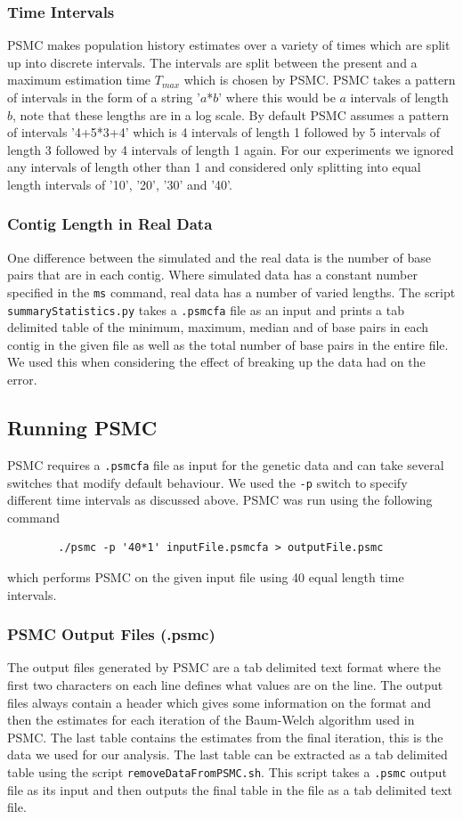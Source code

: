 \documentclass[11pt,a4paper]{article}
\begin{document}
\subsubsection{Time Intervals}
PSMC makes population history estimates over a variety of times which are split up into discrete intervals. The intervals are split between the present and a maximum estimation time $T_{max}$ which is chosen by PSMC. PSMC takes a pattern of intervals in the form of a string '$a$*$b$' where this would be $a$ intervals of length $b$, note that these lengths are in a log scale. By default PSMC assumes a pattern of intervals '4+5*3+4' which is 4 intervals of length 1 followed by 5 intervals of length 3 followed by 4 intervals of length 1 again. For our experiments we ignored any intervals of length other than 1 and considered only splitting into equal length intervals of '10', '20', '30' and '40'.

\subsubsection{Contig Length in Real Data}
One difference between the simulated and the real data is the number of base pairs that are in each contig. Where simulated data has a constant number specified in the \verb|ms| command, real data has a number of varied lengths. The script \verb|summaryStatistics.py| takes a \verb|.psmcfa| file as an input and prints a tab delimited table of the minimum, maximum, median and of base pairs in each contig in the given file as well as the total number of base pairs in the entire file. We used this when considering the effect of breaking up the data had on the error.

\subsection{Running PSMC}
PSMC requires a \verb|.psmcfa| file as input for the genetic data and can take several switches that modify default behaviour. We used the \verb|-p| switch to specify different time intervals as discussed above. PSMC was run using the following command
\begin{verbatim}
		./psmc -p '40*1' inputFile.psmcfa > outputFile.psmc
\end{verbatim}
which performs PSMC on the given input file using 40 equal length time intervals.

\subsubsection{PSMC Output Files (.psmc)}
The output files generated by PSMC are a tab delimited text format where the first two characters on each line defines what values are on the line. The output files always contain a header which gives some information on the format and then the estimates for each iteration of the Baum-Welch algorithm used in PSMC. The last table contains the estimates from the final iteration, this is the data we used for our analysis. The last table can be extracted as a tab delimited table using the script \verb|removeDataFromPSMC.sh|. This script takes a \verb|.psmc| output file as its input and then outputs the final table in the file as a tab delimited text file.
\end{document}
